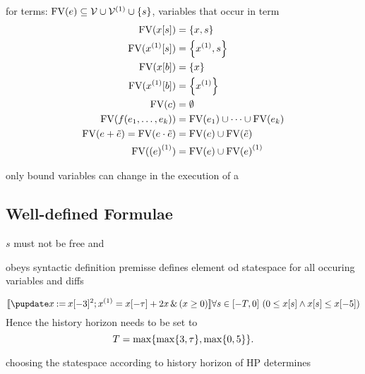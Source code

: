         \begin{definition}
            for terms: $\freevars{\astrm}\subseteq\allvars\cup\diffvars\cup\set{s}$, variables that occur in term
            \begin{align*}
                \freevars{\x[s]} &= \set{x,s}\\
                \freevars{\Dx[s]} &= \set{\D{x},s}\\
                \freevars{\x[b]} &= \set{x}\\
                \freevars{\Dx[b]} &= \set{\D{x}}\\
                \freevars{c} &= \emptyset\\
                \freevars{f(\range{\istrm{1}}{\istrm{k}})} &= \freevars{\istrm{1}} \cup\cdots\cup \freevars{\istrm{k}}\\
                \freevars{\astrm + \bstrm} = \freevars{\astrm \cdot \bstrm} &= \freevars{\astrm}\cup\freevars{\bstrm}\\
                \freevars{\D{(\astrm)}} &= \freevars{\astrm}\cup\D{\freevars{\astrm}}
            \end{align*}
                
        \end{definition} 

        only bound variables can change in the execution of a \HP   

    \subsection{Well-defined Formulae}
        \label{sec:well-definedness}
    
        $s$ must not be free
        and

        \begin{definition}
            obeys syntactic definition
            premisse defines element od statespace for all occuring variables and diffs
        \end{definition}

        \begin{example}
            \begin{equation*}
                \dbox{\hupdate{\humod{x}{\x[-3]^2}};\hevolvein{\D{x}=\x[-\tau]+2x}{(x\geq 0)}}{\holdssinceclosed{-T}{0\leq \x[s] \land \x[s]\leq\x[-5]}}
            \end{equation*}
            Hence the history horizon needs to be set to
            \begin{equation*}
                T=\max\set{\max\set{3,\tau},\max\set{0,5}}.
            \end{equation*}
        \end{example}

        \begin{lemma}
            choosing the statespace according to history horizon of HP determines
        \end{lemma}

        \begin{example}
            
        \end{example}
